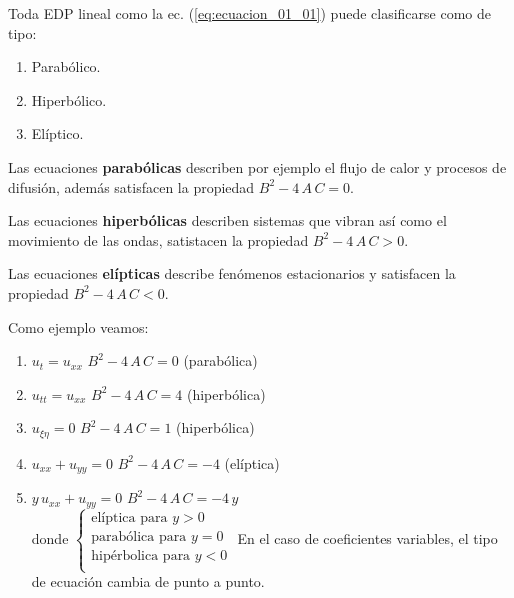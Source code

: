 Toda EDP lineal como la ec. (\ref{eq:ecuacion_01_01}) puede clasificarse como de tipo:
\begin{enumerate}
\item Parabólico.
\item Hiperbólico.
\item Elíptico.
\end{enumerate}

Las ecuaciones \textbf{parabólicas} describen por ejemplo el flujo de calor y procesos de difusión, además satisfacen la propiedad $B^{2} - 4 \, A \, C = 0$.
\par
Las ecuaciones \textbf{hiperbólicas} describen sistemas que vibran así como el movimiento de las ondas, satistacen la propiedad $B^{2} - 4 \, A \, C > 0$.
\par
Las ecuaciones \textbf{elípticas} describe fenómenos estacionarios y satisfacen la propiedad $B^{2} - 4 \, A \, C < 0$.

Como ejemplo veamos:
\begin{enumerate}
\setlength\itemsep{1em}
\item $u_{t} = u_{xx}$ \hspace{1cm} $B^{2} - 4 \, A \, C = 0$ \hspace{1cm} (parabólica)
\item $u_{tt} = u_{xx}$ \hspace{0.8cm} $B^{2} - 4 \, A \, C = 4$ \hspace{1cm} (hiperbólica)
\item $u_{\xi \eta} = 0$ \hspace{1cm} $B^{2} - 4 \, A \, C = 1$ \hspace{1cm} (hiperbólica)
\item $u_{xx} + u_{yy} = 0$ \hspace{1cm} $B^{2} - 4 \, A \, C = -4$ \hspace{0.6cm} (elíptica)
\item $y \, u_{xx} + u_{yy} = 0$ \hspace{0.6cm} $B^{2} - 4 \, A \, C = - 4 \, y$ 
\\
donde $\begin{cases}
\mbox{elíptica para } y > 0 \\
\mbox{parabólica para } y = 0 \\
\mbox{hipérbolica para } y < 0 \\
\end{cases}$
\newline
En el caso de coeficientes variables, el tipo de ecuación cambia de punto a punto.
\end{enumerate}


